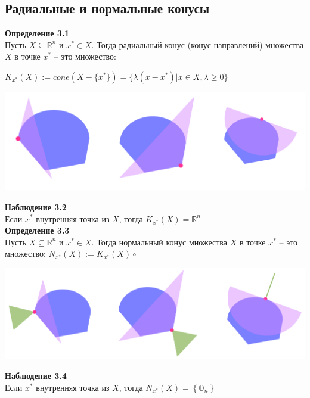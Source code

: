 \subsection{Радиальные и нормальные конусы}
\textbf{Определение 3.1}\\
Пусть $ X\subseteq\mathbb{R}^n$ и $x^* \in X$. Тогда радиальный конус (конус направлений) множества $X$ в точке $x^*$ -- это множество:
\begin{center}
    $K_{x^*}(X):= cone(X-\{x^*\})=\{\lambda(x-x^*)| x \in X, \lambda \geq 0\}$\\
\end{center}
\begin{center}
\includegraphics[scale=0.3]{radk.png}
\end{center}
\noindent\textbf{Наблюдение 3.2}\\
Если $x^*$ внутренняя точка из $X$, тогда $K_{x^*}(X)=\mathbb{R}^n$\\

\noindent\textbf{Определение 3.3}\\
Пусть $ X\subseteq\mathbb{R}^n$ и $x^* \in X$. Тогда нормальный конус множества $X$ в точке $x^*$ -- это множество: $N_{x^*}(X):= K_{x^*}(X)\circ$\\
\begin{center}
\includegraphics[scale=0.3]{normk.png}
\end{center}
\noindent\textbf{Наблюдение 3.4}\\
Если $x^*$ внутренняя точка из $X$, тогда $N_{x^*}(X)=\left\lbrace\mathbb{O}_n\right\rbrace$\\
